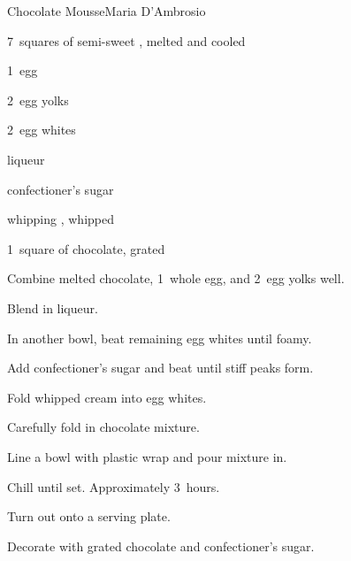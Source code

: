 \begin{recipe}{Chocolate Mousse}{Maria D'Ambrosio}{}

\begin{ingredients}
\item 7~squares of semi-sweet , melted and cooled
\item 1~egg
\item 2~egg yolks
\item 2~egg whites
\item {} liqueur
\item {} confectioner's sugar
\item {} whipping , whipped
\item 1~square of chocolate, grated
\end{ingredients}

\begin{directions}
\item Combine melted chocolate, 1~whole egg, and 2~egg yolks well.
\item Blend in liqueur.
\item In another bowl, beat remaining egg whites until foamy.
\item Add confectioner's sugar and beat until stiff peaks form.
\item Fold whipped cream into egg whites.
\item Carefully fold in chocolate mixture.
\item Line a  bowl with plastic wrap and pour mixture in.
\item Chill until set. Approximately 3~hours.
\item Turn out onto a serving plate.
\item Decorate with grated chocolate and confectioner's sugar.
\end{directions}

\end{recipe}
